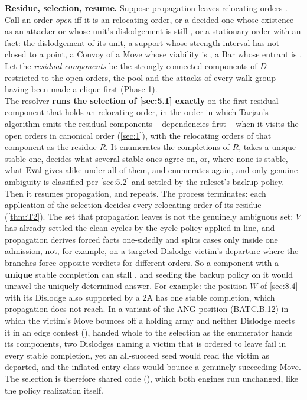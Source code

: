 \documentclass[12pt,a4paper]{article}
\begin{document}
\textbf{Residue, selection, resume.}
Suppose propagation leaves relocating orders .
Call an order \emph{open} iff it is an  relocating order, or a decided one whose existence as an attacker or whose unit's dislodgement is still , or a stationary order with an  fact: the dislodgement of its unit, a support whose strength interval has not closed to a point, a Convoy of a Move whose viability is , a Bar whose entrant is .\\
Let the \emph{residual components} be the strongly connected components of $D$ restricted to the open orders, the pool and the attacks of every walk group having been made a clique first (Phase 1).\\
The resolver \textbf{runs the selection of \cref{sec:5.1} exactly} on the first residual component that holds an  relocating order, in the order in which Tarjan's algorithm emits the residual components -- dependencies first -- when it visits the open orders in canonical order (\cref{sec:1}), with the  relocating orders of that component as the residue $R$.
It enumerates the completions of $R$, takes a unique stable one, decides what several stable ones agree on, or, where none is stable, what $\operatorname{Eval}$ gives alike under all of them, and enumerates again, and only genuine ambiguity is classified per \cref{sec:5.2} and settled by the ruleset's backup policy.
Then it resumes propagation, and repeats.
The process terminates: each application of the selection decides every relocating order of its residue (\cref{thm:T2}).
The set that propagation leaves  is not the genuinely ambiguous set: $V$ has already settled the clean cycles by the cycle policy applied in-line, and propagation derives forced facts one-sidedly and splits cases only inside one admission, not, for example, on a targeted Dislodge victim's departure where the branches force opposite verdicts for different orders.
So a component with a \textbf{unique} stable completion can stall , and seeding the backup policy on it would unravel the uniquely determined answer.
For example: the position $W$ of \cref{sec:8.4} with its Dislodge also supported by a 2A has one stable completion, which propagation does not reach.
In a variant of the ANG position (BATC.B.12) in which the victim's Move bounces off a holding army and neither Dislodge meets it in an edge contest (), handed whole to the selection as the enumerator hands its components, two Dislodges naming a victim that is ordered to leave fail in every stable completion, yet an all-succeed seed would read the victim as departed, and the inflated entry class would bounce a genuinely succeeding Move.
The selection is therefore shared code (), which both engines run unchanged, like the policy realization itself.
\end{document}
